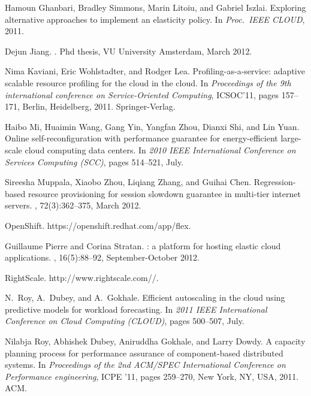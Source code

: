 \documentclass{sig-alternate-10pt}
\begin{document}
\begin{thebibliography}{10}
Hamoun Ghanbari, Bradley Simmons, Marin Litoiu, and Gabriel Iszlai.
\newblock Exploring alternative approaches to implement an elasticity policy.
\newblock In {\em Proc.\ IEEE CLOUD}, 2011.

Dejun Jiang.
.
\newblock Phd thesis, VU University Amsterdam, March 2012.

Nima Kaviani, Eric Wohlstadter, and Rodger Lea.
\newblock Profiling-as-a-service: adaptive scalable resource profiling for the
  cloud in the cloud.
\newblock In {\em Proceedings of the 9th international conference on
  Service-Oriented Computing}, {ICSOC'11}, pages 157--171, Berlin, Heidelberg,
  2011. Springer-Verlag.

Haibo Mi, Huaimin Wang, Gang Yin, Yangfan Zhou, Dianxi Shi, and Lin Yuan.
\newblock Online self-reconfiguration with performance guarantee for
  energy-efficient large-scale cloud computing data centers.
\newblock In {\em 2010 {IEEE} International Conference on Services Computing
  ({SCC)}}, pages 514--521, July.

Sireesha Muppala, Xiaobo Zhou, Liqiang Zhang, and Guihai Chen.
\newblock Regression-based resource provisioning for session slowdown guarantee
  in multi-tier internet servers.
, 72(3):362--375,
  March 2012.

{OpenShift. https://openshift.redhat.com/app/flex}.

Guillaume Pierre and Corina Stratan.
: a platform for hosting elastic cloud applications.
, 16(5):88--92, September-October 2012.

{RightScale. http://www.rightscale.com//}.

N.~Roy, A.~Dubey, and A.~Gokhale.
\newblock Efficient autoscaling in the cloud using predictive models for
  workload forecasting.
\newblock In {\em 2011 {IEEE} International Conference on Cloud Computing
  ({CLOUD)}}, pages 500--507, July.

Nilabja Roy, Abhishek Dubey, Aniruddha Gokhale, and Larry Dowdy.
\newblock A capacity planning process for performance assurance of
  component-based distributed systems.
\newblock In {\em Proceedings of the 2nd ACM/SPEC International Conference on
  Performance engineering}, ICPE '11, pages 259--270, New York, NY, USA, 2011.
  ACM.


\end{thebibliography}
\end{document}
